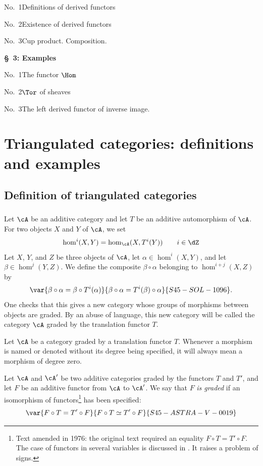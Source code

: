 \noindent No.~1\quad Definitions of derived functors\par
\noindent No.~2\quad Existence of derived functors\par
\noindent No.~3\quad Cup product. Composition.\par
\medskip\noindent\textbf{\S~3: Examples}\par
\noindent No.~1\quad The functor $\Hom$\par
\noindent No.~2\quad $\Tor$ of sheaves\par
\noindent No.~3\quad The left derived functor of inverse image.\par

\section{Triangulated categories: definitions and examples}\label{VIII:1}

\subsection{Definition of triangulated categories}\label{VIII:1-1}

\addtocounter{subsubsection}{-1}
\subsubsection{}\label{VIII:1-1-0}

Let $\cA$ be an additive category and let $T$ be an additive automorphism of
$\cA$. For two objects $X$ and $Y$ of $\cA$, we set
\[
  \hom^i(X,Y) = \hom_\cA(X,T^i(Y)) \qquad i\in \dZ
\]
Let $X$, $Y$, and $Z$ be three objects of $\cA$, let
$\alpha\in \hom^i(X,Y)$, and let $\beta\in \hom^j(Y,Z)$. We define the
composite $\beta\circ\alpha$ belonging to $\hom^{i+j}(X,Z)$ by
\[
  \var{\beta\circ \alpha = \beta\circ T^i(\alpha)}{\beta\circ \alpha = T^i(\beta)\circ\alpha}{S45-SOL-1096} \text{.}
\]
One checks that this gives a new category whose groups of morphisms between
objects are graded. By an abuse of language, this new category will be called
the category $\cA$ graded by the translation functor $T$.

Let $\cA$ be a category graded by a translation functor $T$. Whenever a
morphism is named or denoted without its degree being specified, it will
always mean a morphism of degree zero.

Let $\cA$ and $\cA'$ be two additive categories graded by the functors $T$
and $T'$, and let $F$ be an additive functor from $\cA$ to $\cA'$. We say
that $F$ \emph{is graded} if an isomorphism of
functors\footnote{Text amended in 1976: the original text required an
equality $F\circ T=T'\circ F$. The case of functors in several variables is
discussed in \cite[XVII 0.3]{sga4}. It raises a problem of signs.}
has been specified:
\[
  \var{F\circ T = T'\circ F}{F\circ T \simeq T'\circ F}{S45-ASTRA-V-0019}
\]

